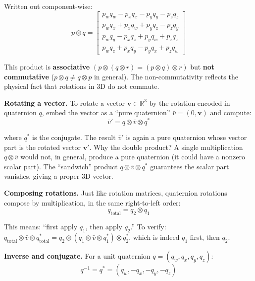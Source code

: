Written out component-wise:
\begin{equation}
p \otimes q = \begin{bmatrix}
p_w q_w - p_x q_x - p_y q_y - p_z q_z \\
p_w q_x + p_x q_w + p_y q_z - p_z q_y \\
p_w q_y - p_x q_z + p_y q_w + p_z q_x \\
p_w q_z + p_x q_y - p_y q_x + p_z q_w
\end{bmatrix}
\end{equation}

This product is \textbf{associative} $(p \otimes (q \otimes r) = (p \otimes q) \otimes r)$ but \textbf{not commutative} ($p \otimes q \neq q \otimes p$ in general). The non-commutativity reflects the physical fact that rotations in 3D do not commute.

\textbf{Rotating a vector.} To rotate a vector $\mathbf{v} \in \mathbb{R}^3$ by the rotation encoded in quaternion $q$, embed the vector as a ``pure quaternion'' $\bar{v} = (0, \mathbf{v})$ and compute:
\begin{equation}
\bar{v}' = q \otimes \bar{v} \otimes q^*
\end{equation}

where $q^*$ is the conjugate. The result $\bar{v}'$ is again a pure quaternion whose vector part is the rotated vector $\mathbf{v}'$. Why the double product? A single multiplication $q \otimes \bar{v}$ would not, in general, produce a pure quaternion (it could have a nonzero scalar part). The ``sandwich'' product $q \otimes \bar{v} \otimes q^*$ guarantees the scalar part vanishes, giving a proper 3D vector.

\textbf{Composing rotations.} Just like rotation matrices, quaternion rotations compose by multiplication, in the same right-to-left order:
\begin{equation}
q_{\text{total}} = q_2 \otimes q_1
\end{equation}

This means: ``first apply $q_1$, then apply $q_2$.'' To verify: $q_{\text{total}} \otimes \bar{v} \otimes q_{\text{total}}^* = q_2 \otimes (q_1 \otimes \bar{v} \otimes q_1^*) \otimes q_2^*$, which is indeed $q_1$ first, then $q_2$.

\textbf{Inverse and conjugate.} For a unit quaternion $q = (q_w, q_x, q_y, q_z)$:
\begin{equation}
q^{-1} = q^* = (q_w, -q_x, -q_y, -q_z)
\end{equation}

